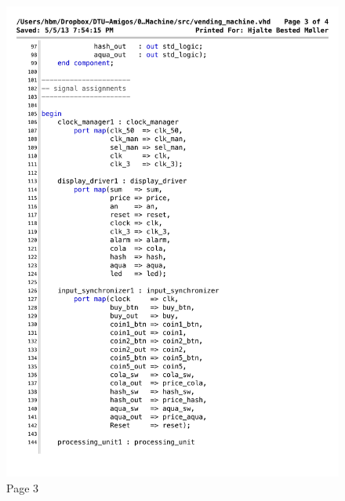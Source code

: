 \begin{figure}[!h]
\centering
\includegraphics[scale=0.6]{figs/vending_machine_3.pdf}
\caption{Page 3}
\label{vhd:vending3}
\end{figure}

